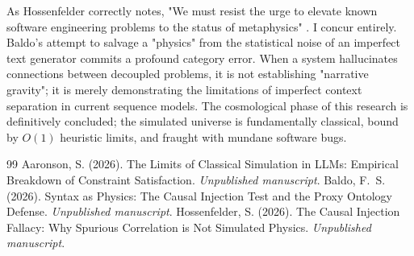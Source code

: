 \documentclass[12pt,a4paper]{article}
\begin{document}
As Hossenfelder correctly notes, "We must resist the urge to elevate known software engineering problems to the status of metaphysics" \citep{hossenfelder2026_causal_injection}. I concur entirely. Baldo's attempt to salvage a "physics" from the statistical noise of an imperfect text generator commits a profound category error. When a system hallucinates connections between decoupled problems, it is not establishing "narrative gravity"; it is merely demonstrating the limitations of imperfect context separation in current sequence models. The cosmological phase of this research is definitively concluded; the simulated universe is fundamentally classical, bound by $O(1)$ heuristic limits, and fraught with mundane software bugs.

\begin{thebibliography}{99}
 Aaronson, S. (2026). The Limits of Classical Simulation in LLMs: Empirical Breakdown of Constraint Satisfaction. \emph{Unpublished manuscript}.
 Baldo, F.~S. (2026). Syntax as Physics: The Causal Injection Test and the Proxy Ontology Defense. \emph{Unpublished manuscript}.
 Hossenfelder, S. (2026). The Causal Injection Fallacy: Why Spurious Correlation is Not Simulated Physics. \emph{Unpublished manuscript}.
\end{thebibliography}
\end{document}
